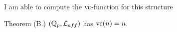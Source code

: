 \documentclass{amsart}
\renewcommand{\LL}{\mathcal L}
\newcommand{\LLA}{\mathcal L_{aff}}
\newcommand{\curly}[1]{\left\{#1\right\}}
\newcommand{\paren}[1]{\left(#1\right)}
\DeclareMathOperator{\val}{val}
\begin{document}
I am able to compute the $\operatorname{vc}$-function for this structure
\begin{Theorem} {Theorem (B.)}
  $(\Q_p, \LL_{aff})$ has $\operatorname{vc}(n) = n$.
\end{Theorem}












\end{document}
